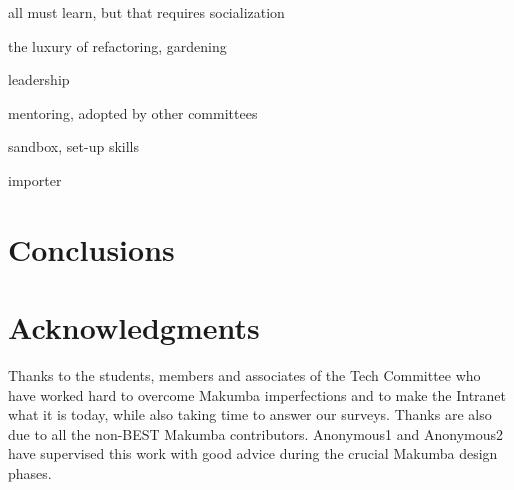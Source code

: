 \documentclass{acm_proc_article-sp}
\begin{document}
all must learn, but that requires socialization

the luxury of refactoring, gardening

leadership

mentoring, adopted by other committees

sandbox, set-up skills

importer



\section{Conclusions}\label{sec:conclusions}

\section{Acknowledgments}\label{sec:acknowledgments}
Thanks to the students, members and associates of the Tech Committee who have worked hard to overcome Makumba imperfections and to make the Intranet what it is today, while also taking time to answer our surveys.  Thanks are also due to all the non-BEST Makumba contributors.  Anonymous1 and Anonymous2 have supervised this work with good advice during the crucial Makumba design phases.

%

 

%

\balancecolumns
\end{document}

